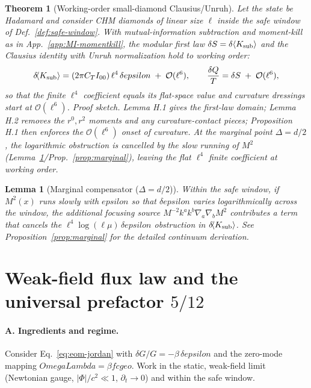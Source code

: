 \documentclass[aps,prd,onecolumn,superscriptaddress,nofootinbib]{revtex4-2}
\def\OmL{OmegaLambda}%
\def\cgeo{cgeo}%
\def\eps{epsilon}%
\newcommand{\OmL}{\Omega_\Lambda}
\newcommand{\cgeo}{c_{\rm geo}}
\newcommand{\eps}{\varepsilon}
\newtheorem{lemma}{Lemma}
\newtheorem{theorem}{Theorem}
\begin{document}
\begin{theorem}[Working-order small-diamond Clausius/Unruh]
\label{thm:A2-working}
Let the state be Hadamard and consider CHM diamonds of linear size $\ell$ inside the safe window of Def.~\ref{def:safe-window}. With mutual-information subtraction and moment-kill as in App.~\ref{app:MI-momentkill}, the modular first law $\delta S=\delta\langle K_{\rm sub}\rangle$ and the Clausius identity with Unruh normalization hold to working order:
\[
\delta\!\langle K_{\rm sub}\rangle
= (2\pi C_T I_{00})\,\ell^4\,\delta\eps \;+\; \mathcal O(\ell^6),
\qquad
\frac{\delta Q}{T}=\delta S \;+\; \mathcal O(\ell^6),
\]
so that the finite $\ell^4$ coefficient equals its flat-space value and curvature dressings start at $\mathcal O(\ell^6)$. \emph{Proof sketch.} Lemma H.1 gives the first-law domain; Lemma H.2 removes the $r^0,r^2$ moments and any curvature-contact pieces; Proposition H.1 then enforces the $\mathcal O(\ell^6)$ onset of curvature. At the marginal point $\Delta=d/2$, the logarithmic obstruction is cancelled by the slow running of $M^2$ (Lemma~\ref{lem:A2-marginal}/Prop.~\ref{prop:marginal}), leaving the flat $\ell^4$ finite coefficient at working order.
\end{theorem}

\begin{lemma}[Marginal compensator ($\Delta=d/2$)]
\label{lem:A2-marginal}
Within the safe window, if $M^2(x)$ runs slowly with $\eps$ so that $\delta\eps$ varies logarithmically across the window, the additional focusing source $M^{-2}k^a k^b\nabla_a\nabla_b M^2$ contributes a term that cancels the $\ell^4\log(\ell\mu)\,\delta\eps$ obstruction in $\delta\!\langle K_{\rm sub}\rangle$. See Proposition~\ref{prop:marginal} for the detailed continuum derivation.
\end{lemma}

\section{Weak-field flux law and the universal prefactor \texorpdfstring{$5/12$}{5/12}}
\label{app:a0-derivation}
\paragraph*{A. Ingredients and regime.}
Consider Eq.~\eqref{eq:eom-jordan} with $\delta G/G=-\beta\,\delta\eps$ and the zero-mode mapping $\OmL=\beta f \cgeo$.
Work in the static, weak-field limit (Newtonian gauge, $|\Phi|/c^2\ll1$, $\partial_t\to 0$) and within the safe window.
\end{document}
